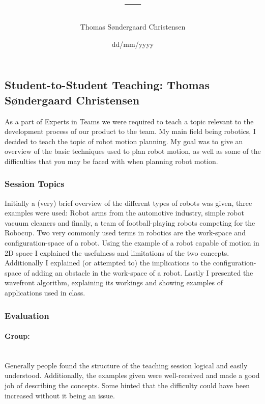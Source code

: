 \documentclass[11pt,a4paper]{article}
\author{Thomas Søndergaard Christensen}
\title{---}
\date{dd/mm/yyyy}
\begin{document}
\subsection{Student-to-Student Teaching: Thomas Søndergaard Christensen}
As a part of Experts in Teams we were required to teach a topic relevant to the development process of our product to the team. My main field being robotics, I decided to teach the topic of robot motion planning. My goal was to give an overview of the basic techniques used to plan robot motion, as well as some of the difficulties that you may be faced with when planning robot motion.
\subsubsection{Session Topics}
Initially a (very) brief overview of the different types of robots was given, three examples were used: Robot arms from the automotive industry, simple robot vacuum cleaners and finally, a team of football-playing robots competing for the Robocup.
Two very commonly used terms in robotics are the work-space and configuration-space of a robot. Using the example of a robot capable of motion in 2D space I explained the usefulness and limitations of the two concepts. Additionally I explained (or attempted to) the implications to the configuration-space of adding an obstacle in the work-space of a robot.
Lastly I presented the wavefront algorithm, explaining its workings and showing examples of applications used in class.
\subsubsection{Evaluation}
\paragraph{Group:}~\\
Generally people found the structure of the teaching session logical and easily understood. Additionally, the examples given were well-received and made a good job of describing the concepts. Some hinted that the difficulty could have been increased without it being an issue.
\end{document}
